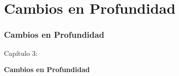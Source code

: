 %

\section{Cambios en Profundidad}
\begin{frame}[fragile]
	\frametitle{Cambios en Profundidad}

	\begin{center}\huge{Capítulo 3:}\end{center}
	\begin{center}\huge{\color{typo3darkgrey}\textbf{Cambios en Profundidad}}\end{center}

\end{frame}


